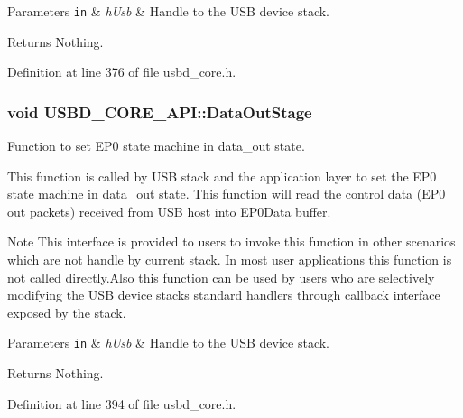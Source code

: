 \begin{DoxyParams}[1]{Parameters}
\mbox{\tt in}  & {\em h\+Usb} & Handle to the U\+SB device stack. \\
\hline
\end{DoxyParams}
\begin{DoxyReturn}{Returns}
Nothing. 
\end{DoxyReturn}


Definition at line 376 of file usbd\+\_\+core.\+h.

\subsubsection[{\texorpdfstring{Data\+Out\+Stage}{DataOutStage}}]{\setlength{\rightskip}{0pt plus 5cm}void U\+S\+B\+D\+\_\+\+C\+O\+R\+E\+\_\+\+A\+P\+I\+::\+Data\+Out\+Stage}\hypertarget{structUSBD__CORE__API_ac4232f616e5ec409d0ca853bf704175f}{}\label{structUSBD__CORE__API_ac4232f616e5ec409d0ca853bf704175f}
Function to set E\+P0 state machine in data\+\_\+out state.

This function is called by U\+SB stack and the application layer to set the E\+P0 state machine in data\+\_\+out state. This function will read the control data (E\+P0 out packets) received from U\+SB host into E\+P0\+Data buffer. ~\newline
\begin{DoxyNote}{Note}
This interface is provided to users to invoke this function in other scenarios which are not handle by current stack. In most user applications this function is not called directly.\+Also this function can be used by users who are selectively modifying the U\+SB device stack\textquotesingle{}s standard handlers through callback interface exposed by the stack.
\end{DoxyNote}

\begin{DoxyParams}[1]{Parameters}
\mbox{\tt in}  & {\em h\+Usb} & Handle to the U\+SB device stack. \\
\hline
\end{DoxyParams}
\begin{DoxyReturn}{Returns}
Nothing. 
\end{DoxyReturn}


Definition at line 394 of file usbd\+\_\+core.\+h.

